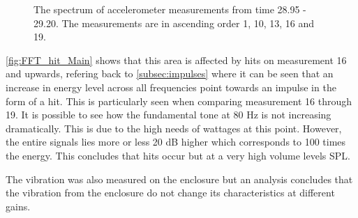 \begin{figure}[H]
\centering
{}

\caption{The spectrum of accelerometer measurements from time 28.95 - 29.20. The measurements are in ascending order 1, 10, 13, 16 and 19.}
\label{fig:FFT_hit_Main}
\end{figure}

\autoref{fig:FFT_hit_Main} shows that this area is affected by hits on measurement 16 and upwards, refering back to \autoref{subsec:impulses} where it can be seen that an increase in energy level across all frequencies point towards an impulse in the form of a hit. This is particularly seen when comparing measurement 16 through 19. It is possible to see how the fundamental tone at 80 Hz is not increasing dramatically. This is due to the high needs of wattages at this point. However, the entire signals lies more or less 20 dB higher which corresponds to 100 times the energy. This concludes that hits occur but at a very high volume levels \gls{SPL}.

The vibration was also measured on the enclosure but an analysis concludes that the vibration from the enclosure do not change its characteristics at different gains.





